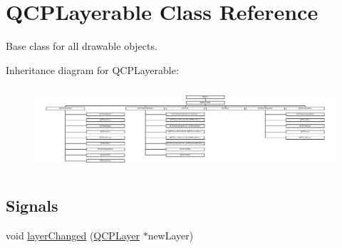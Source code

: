 \hypertarget{class_q_c_p_layerable}{}\section{Q\+C\+P\+Layerable Class Reference}
\label{class_q_c_p_layerable}


Base class for all drawable objects.  


Inheritance diagram for Q\+C\+P\+Layerable\+:\begin{figure}[H]
\begin{center}
\leavevmode
\includegraphics[height=3.106796cm]{class_q_c_p_layerable}
\end{center}
\end{figure}
\subsection*{Signals}
\begin{DoxyCompactItemize}
\item 
void \mbox{\hyperlink{class_q_c_p_layerable_abbf8657cedea73ac1c3499b521c90eba}{layer\+Changed}} (\mbox{\hyperlink{class_q_c_p_layer}{Q\+C\+P\+Layer}} $\ast$new\+Layer)
\end{DoxyCompactItemize}
